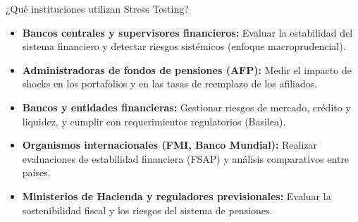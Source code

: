 \documentclass{beamer}
\begin{document}
\begin{frame}{¿Qué instituciones utilizan Stress Testing?}

\begin{itemize}

\item \textbf{Bancos centrales y supervisores financieros:}  
Evaluar la estabilidad del sistema financiero y detectar riesgos sistémicos (enfoque macroprudencial).

\vspace{0.3cm}

\item \textbf{Administradoras de fondos de pensiones (AFP):}  
Medir el impacto de shocks en los portafolios y en las tasas de reemplazo de los afiliados.

\vspace{0.3cm}

\item \textbf{Bancos y entidades financieras:}  
Gestionar riesgos de mercado, crédito y liquidez, y cumplir con requerimientos regulatorios (Basilea).

\vspace{0.3cm}

\item \textbf{Organismos internacionales (FMI, Banco Mundial):}  
Realizar evaluaciones de estabilidad financiera (FSAP) y análisis comparativos entre países.

\vspace{0.3cm}

\item \textbf{Ministerios de Hacienda y reguladores previsionales:}  
Evaluar la sostenibilidad fiscal y los riesgos del sistema de pensiones.

\end{itemize}

\end{frame}
\end{document}

